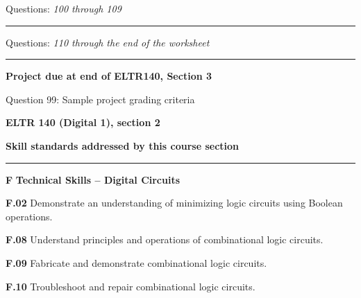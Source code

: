 \hskip 10pt Questions: {\it 100 through 109}
 
\vskip 10pt
\hrule \vskip 5pt
\noindent
{}

\hskip 10pt Questions: {\it 110 through the end of the worksheet}
 
\vskip 10pt
\hrule \vskip 5pt
\noindent
{}

\hskip 10pt {\bf Project due at end of ELTR140, Section 3}
 
\hskip 10pt Question 99: Sample project grading criteria
 
\vskip 10pt









\vfil \eject

\centerline{\bf ELTR 140 (Digital 1), section 2} \bigskip 
 
\vskip 10pt

\noindent
{\bf Skill standards addressed by this course section}

\vskip 5pt

\hrule \vskip 10pt
\noindent
{}

\vskip 5pt

\medskip
\item{\bf F} {\bf Technical Skills -- Digital Circuits}
\item{\bf F.02} Demonstrate an understanding of minimizing logic circuits using Boolean operations.
\item{\bf F.08} Understand principles and operations of combinational logic circuits.
\item{\bf F.09} Fabricate and demonstrate combinational logic circuits.
\item{\bf F.10} Troubleshoot and repair combinational logic circuits.
\medskip

\vskip 5pt

